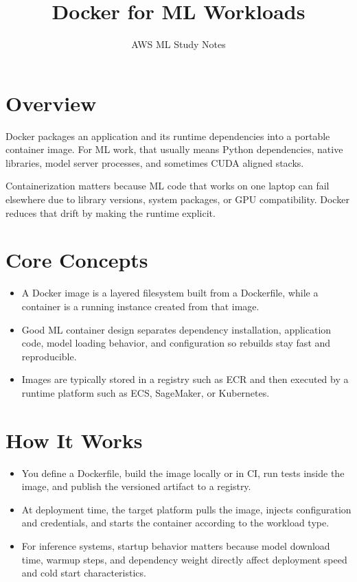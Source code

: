 \documentclass[10pt,twocolumn]{article}
\begin{document}
\title{\vspace{-1.6cm}Docker for ML Workloads}
\author{AWS ML Study Notes}
\date{}
\maketitle
\small

\section*{Overview}
Docker packages an application and its runtime dependencies into a portable container image. For ML work, that usually means Python dependencies, native libraries, model server processes, and sometimes CUDA aligned stacks.

Containerization matters because ML code that works on one laptop can fail elsewhere due to library versions, system packages, or GPU compatibility. Docker reduces that drift by making the runtime explicit.

\section*{Core Concepts}
\begin{itemize}
\item A Docker image is a layered filesystem built from a Dockerfile, while a container is a running instance created from that image.
\item Good ML container design separates dependency installation, application code, model loading behavior, and configuration so rebuilds stay fast and reproducible.
\item Images are typically stored in a registry such as ECR and then executed by a runtime platform such as ECS, SageMaker, or Kubernetes.
\end{itemize}

\section*{How It Works}
\begin{itemize}
\item You define a Dockerfile, build the image locally or in CI, run tests inside the image, and publish the versioned artifact to a registry.
\item At deployment time, the target platform pulls the image, injects configuration and credentials, and starts the container according to the workload type.
\item For inference systems, startup behavior matters because model download time, warmup steps, and dependency weight directly affect deployment speed and cold start characteristics.
\end{itemize}
\end{document}
